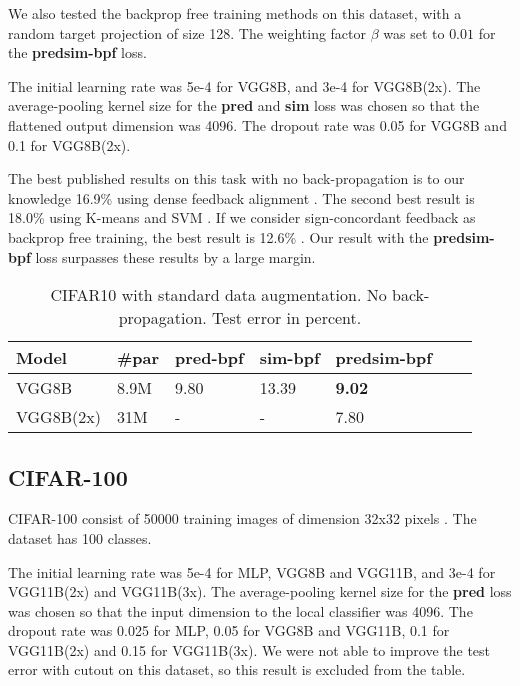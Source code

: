 \documentclass{article}
\begin{document}
We also tested the backprop free training methods on this dataset, with a random target projection of size 128. The weighting factor $\beta$ was set to $0.01$ for the \textbf{predsim-bpf} loss. 

The initial learning rate was 5e-4 for VGG8B, and 3e-4 for VGG8B(2x). The average-pooling kernel size for the \textbf{pred} and \textbf{sim} loss was chosen so that the flattened output dimension was 4096. The dropout rate was 0.05 for VGG8B and 0.1 for VGG8B(2x).

The best published results on this task with no back-propagation is to our knowledge 16.9\% using dense feedback alignment \cite{MoskovitzLKA18}. The second best result is 18.0\% using K-means and SVM \cite{CoatesN11}. If we consider sign-concordant feedback as backprop free training, the best result is 12.6\% \cite{MoskovitzLKA18}. Our result with the \textbf{predsim-bpf} loss surpasses these results by a large margin.

\begin{table}[h]
  \caption{CIFAR10 with standard data augmentation. No back-propagation. Test error in percent.}
  \label{table:cifar10-bio}
  \centering
  \begin{tabular}{lllllll}
    \toprule
    Model       & \#par & pred-bpf & sim-bpf & predsim-bpf  \\
    \midrule
    VGG8B       & 8.9M & 9.80 & 13.39  & \textbf{9.02} \\
    VGG8B(2x)   & 31M & - & -  & 7.80 \\
    \bottomrule
  \end{tabular}
\end{table}

\subsection{CIFAR-100}

CIFAR-100 consist of 50000 training images of dimension 32x32 pixels \cite{Krizhevsky09}. The dataset has 100 classes. 

The initial learning rate was 5e-4 for MLP, VGG8B and VGG11B, and 3e-4 for VGG11B(2x) and VGG11B(3x). The average-pooling kernel size for the \textbf{pred} loss was chosen so that the input dimension to the local classifier was 4096. The dropout rate was 0.025 for MLP, 0.05 for VGG8B and VGG11B, 0.1 for VGG11B(2x) and 0.15 for VGG11B(3x). We were not able to improve the test error with cutout on this dataset, so this result is excluded from the table. 
\end{document}
